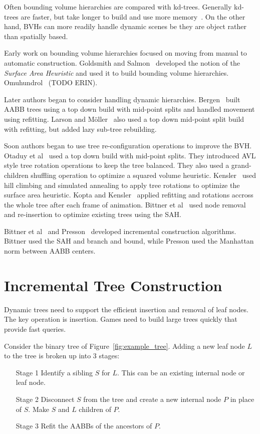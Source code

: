 \documentclass{article}
\begin{document}
Often bounding volume hierarchies are compared with kd-trees. Generally kd-trees are faster, but take longer to build and use more memory~\cite{Vinkler2014}. On the other hand, BVHs can more readily handle dynamic scenes be they are object rather than spatially based.

Early work on bounding volume hierarchies focused on moving from manual to automatic construction. Goldsmith and Salmon~\cite{Goldsmith1987} developed the notion of the \emph{Surface Area Heuristic} and used it to build bounding volume hierarchies. Omuhundrol~\cite{Omohundrol1989} (TODO ERIN).

Later authors began to consider handling dynamic hierarchies. Bergen~\cite{Bergen1998} built AABB trees using a top down build with mid-point splits and handled movement using refitting. Larson and Möller~\cite{Larsson2006} also used a top down mid-point split build with refitting, but added lazy sub-tree rebuilding.

Soon authors began to use tree re-configuration operations to improve the BVH. Otaduy et al~\cite{Otaduy2007} used a top down build with mid-point splits. They introduced AVL style tree rotation operations to keep the tree balanced. They also used a grand-children shuffling operation to optimize a squared volume heuristic. Kensler~\cite{Kensler2008} used hill climbing and simulated annealing to apply tree rotations to optimize the surface area heuristic. Kopta and Kensler~\cite{Kopta2012} applied refitting and rotations accross the whole tree after each frame of animation. Bittner et al~\cite{Bittner2013} used node removal and re-insertion to optimize existing trees using the SAH.

Bittner et al~\cite{Bittner2015} and Presson~\cite{Presson2008} developed incremental construction algorithms. Bittner used the SAH and branch and bound, while Presson used the Manhattan norm between AABB centers.

\section{Incremental Tree Construction}

Dynamic trees need to support the efficient insertion and removal of leaf nodes. The key operation is insertion. Games need to build large trees quickly that provide fast queries.

Consider the binary tree of Figure~\ref{fig:example_tree}. Adding a new leaf node $L$ to the tree is broken up into 3 stages:
\begin{enumerate}
	\item[Stage 1] Identify a sibling $S$ for $L$. This can be an existing internal node or leaf node.
	\item[Stage 2] Disconnect $S$ from the tree and create a new internal node $P$ in place of $S$. Make $S$ and $L$ children of $P$.
	\item[Stage 3] Refit the AABBs of the ancestors of $P$.
\end{enumerate}
\end{document}
